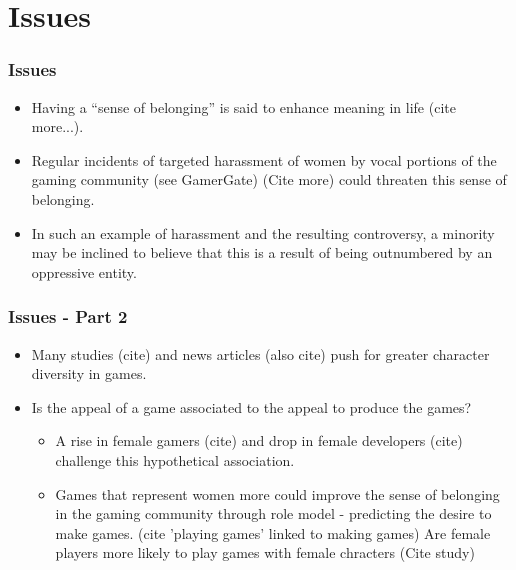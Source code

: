 \documentclass{beamer}
\begin{document}
\section{Issues}
\begin{frame}
    \frametitle{Issues}
    \begin{itemize}
        \item Having a ``sense of belonging'' is said to enhance meaning in life \cite{lambert_belonging_2013} (cite more...).
        \item Regular incidents of targeted harassment of women by vocal portions of the gaming community (see GamerGate) \cite{riot_lawsuit, gonzalez_boysclub_2014} (Cite more) could threaten this sense of belonging.
        \item In such an example of harassment and the resulting controversy, a minority may be inclined to believe that this is a result of being outnumbered by an oppressive entity.
    \end{itemize}
\end{frame}

\begin{frame}
	\frametitle{Issues - Part 2}
	\begin{itemize}
		\item Many studies (cite) and news articles (also cite) push for greater character diversity in games.
		\item Is the appeal of a game associated to the appeal to produce the games?
		\begin{itemize}
			\item A rise in female gamers (cite) and drop in female developers (cite) challenge this hypothetical association.
		\end{itemize}
		\begin{itemize}
			\item Games that represent women more could improve the sense of belonging in the gaming community through role model - predicting the desire to make games. (cite 'playing games' linked to making games)
			Are female players more likely to play games with female chracters (Cite study)
		\end{itemize}
	\end{itemize}
\end{frame}
\end{document}
